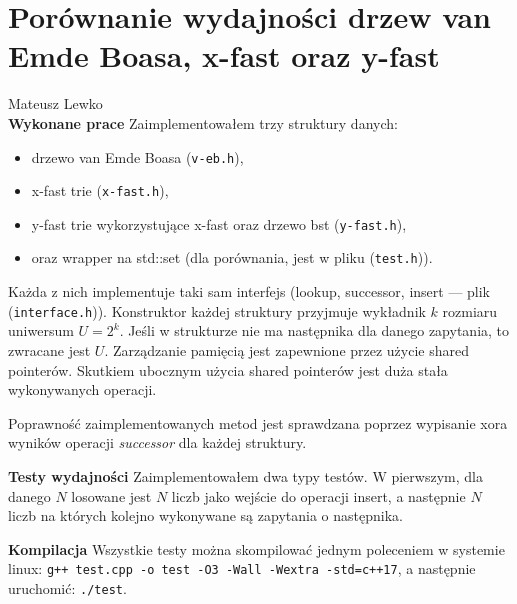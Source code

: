 \documentclass{article}
\begin{document}
\section*{Porównanie wydajności drzew van Emde Boasa, x-fast oraz y-fast}
Mateusz Lewko \\

\textbf{Wykonane prace} Zaimplementowałem trzy struktury danych:
\begin{itemize}
  \item drzewo van Emde Boasa (\texttt{v-eb.h}),
  \item x-fast trie (\texttt{x-fast.h}),
  \item y-fast trie wykorzystujące x-fast oraz drzewo bst (\texttt{y-fast.h}),
  \item oraz wrapper na std::set (dla porównania, jest w pliku (\texttt{test.h})).
\end{itemize}
Każda z nich implementuje taki sam interfejs (lookup, successor,
insert --- plik (\texttt{interface.h})).
Konstruktor każdej struktury przyjmuje wykładnik $k$ rozmiaru uniwersum $U = 2^k$.
Jeśli w strukturze nie ma następnika dla danego zapytania, to zwracane jest $U$.
Zarządzanie pamięcią jest zapewnione przez użycie shared pointerów. Skutkiem ubocznym
użycia shared pointerów jest duża stała wykonywanych operacji.

Poprawność zaimplementowanych metod jest sprawdzana poprzez wypisanie xora
wyników operacji \textit{successor} dla każdej struktury.

\textbf{Testy wydajności}
Zaimplementowałem dwa typy testów. W pierwszym, dla danego $N$ losowane jest
$N$ liczb jako wejście do operacji insert, a następnie $N$ liczb na 
których kolejno wykonywane są zapytania o następnika.

\textbf{Kompilacja} Wszystkie testy można skompilować jednym poleceniem w
systemie linux: \texttt{g++ test.cpp -o test -O3 -Wall -Wextra -std=c++17},
a następnie uruchomić: \texttt{./test}.
\end{document}
